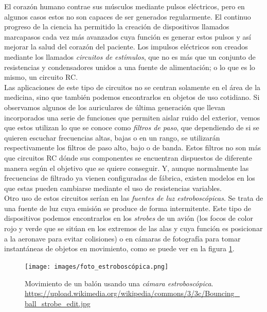 \documentclass[../main.tex]{subfiles}
\begin{document}
El corazón humano contrae sus músculos mediante pulsos eléctricos, pero en algunos casos estos no son capaces de ser generados regularmente. El continuo progreso de la ciencia ha permitido la creación de dispositivos llamados marcapasos cada vez más avanzados cuya función es generar estos pulsos y así mejorar la salud del corazón del paciente. Los impulsos eléctricos son creados mediante los llamados \textit{circuitos de estímulos}, que no es más que un conjunto de resistencias y condensadores unidos a una fuente de alimentación; o lo que es lo mismo, un circuito RC. \cite{intro_circuitos_RC} \\

Las aplicaciones de este tipo de circuitos no se centran solamente en el área de la medicina, sino que también podemos encontrarlos en objetos de uso cotidiano. Si observamos algunos de los auriculares de última generación que llevan incorporados una serie de funciones que permiten aislar ruido del exterior, vemos que estos utilizan lo que se conoce como \textit{filtros de paso}, que dependiendo de si se quieren escuchar frecuencias altas, bajas o en un rango, se utilizarán respectivamente los filtros de paso alto, bajo o de banda. Estos filtros no son más que circuitos RC dónde sus componentes se encuentran dispuestos de diferente manera según el objetivo que se quiere conseguir. Y, aunque normalmente las frecuencias de filtrado ya vienen configuradas de fábrica, existen modelos en los que estas pueden cambiarse mediante el uso de resistencias variables.\\

Otro uso de estos circuitos serían en las \textit{fuentes de luz estroboscópicas}. Se trata de una fuente de luz cuya emisión se produce de forma intermitente. Este tipo de dispositivos podemos encontrarlos en los \textit{strobes} de un avión (los focos de color rojo y verde que se sitúan en los extremos de las alas y cuya función es posicionar a la aeronave para evitar colisiones) o en cámaras de fotografía para tomar instantáneas de objetos en movimiento, como se puede ver en la figura \ref{foto_estroboscópica}.

\begin{figure}[!h]
          \centering
          \texttt{[image: images/foto\_estroboscópica.png]}
          \caption{Movimiento de un balón usando una \textit{cámara estroboscópica}. \url{https://upload.wikimedia.org/wikipedia/commons/3/3c/Bouncing_ball_strobe_edit.jpg}}
          \label{foto_estroboscópica}
\end{figure}
\end{document}
